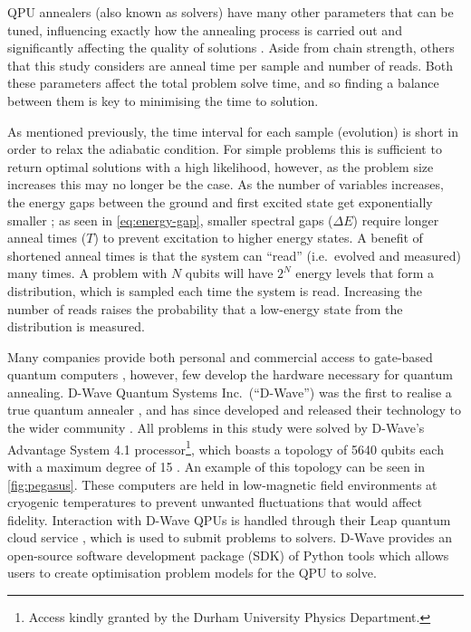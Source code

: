\documentclass[12pt]{article}
\theoremstyle{definition}
\begin{document}
QPU annealers (also known as solvers) have many other parameters that can be tuned, influencing exactly how the annealing process is carried out and significantly affecting the quality of solutions \cite{dwave_qpu}. Aside from chain strength, others that this study considers are anneal time per sample and number of reads. Both these parameters affect the total problem solve time, and so finding a balance between them is key to minimising the time to solution.

As mentioned previously, the time interval for each sample (evolution) is short in order to relax the adiabatic condition. For simple problems this is sufficient to return optimal solutions with a high likelihood, however, as the problem size increases this may no longer be the case. As the number of variables increases, the energy gaps between the ground and first excited state get exponentially smaller \cite{bapst_quantum_2013}; as seen in \cref{eq:energy-gap}, smaller spectral gaps ($\Delta E$) require longer anneal times ($T$) to prevent excitation to higher energy states.
A benefit of shortened anneal times is that the system can ``read'' (i.e.\ evolved and measured) many times. A problem with $N$ qubits will have $2^N$ energy levels that form a distribution, which is sampled each time the system is read. Increasing the number of reads raises the probability that a low-energy state from the distribution is measured.

Many companies provide both personal and commercial access to gate-based quantum computers \cites{google}{ibm}, however, few develop the hardware necessary for quantum annealing. D-Wave Quantum Systems Inc.\ (``D-Wave'') was the first to realise a true quantum annealer \cite{johnson_quantum_2011}, and has since developed and released their technology to the wider community \cite{finley_quantum_2017}. All problems in this study were solved by D-Wave's Advantage System 4.1 processor\footnote{Access kindly granted by the Durham University Physics Department.}, which boasts a topology of \num{5640} qubits each with a maximum degree of \num{15} \cite{dwave_topology}. An example of this topology can be seen in \cref{fig:pegasus}. These computers are held in low-magnetic field environments at cryogenic temperatures to prevent unwanted fluctuations that would affect fidelity.
Interaction with D-Wave QPUs is handled through their Leap quantum cloud service \cite{dwave_leap}, which is used to submit problems to solvers. D-Wave provides an open-source software development package (SDK) of Python tools which allows users to create optimisation problem models for the QPU to solve.
\end{document}
